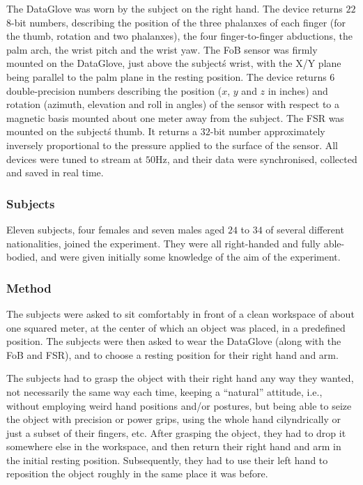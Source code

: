 The DataGlove was worn by the subject on the right hand. The device
returns $22$ $8$-bit numbers, describing the position of the three
phalanxes of each finger (for the thumb, rotation and two phalanxes),
the four finger-to-finger abductions, the palm arch, the wrist pitch
and the wrist yaw. The FoB sensor was firmly mounted on the DataGlove,
just above the subject\'s wrist, with the X/Y plane being parallel to
the palm plane in the resting position. The device returns $6$
double-precision numbers describing the position ($x$, $y$ and $z$ in
inches) and rotation (azimuth, elevation and roll in angles) of the
sensor with respect to a magnetic basis mounted about one meter away
from the subject. The FSR was mounted on the subject\'s thumb. It
returns a $32$-bit number approximately inversely proportional to the
pressure applied to the surface of the sensor. All devices were tuned
to stream at $50$Hz, and their data were synchronised, collected and
saved in real time.

\subsubsection*{Subjects}

Eleven subjects, four females and seven males aged $24$ to $34$ of
several different nationalities, joined the experiment. They were all
right-handed and fully able-bodied, and were given initially some
knowledge of the aim of the experiment.

\subsubsection*{Method}

The subjects were asked to sit comfortably in front of a clean
workspace of about one squared meter, at the center of which an object
was placed, in a predefined position. The subjects were then asked to
wear the DataGlove (along with the FoB and FSR), and to choose a
resting position for their right hand and arm.

The subjects had to grasp the object with their right hand any way
they wanted, not necessarily the same way each time, keeping a
``natural'' attitude, i.e., without employing weird hand positions
and/or postures, but being able to seize the object with precision or
power grips, using the whole hand cilyndrically or just a subset of
their fingers, etc. After grasping the object, they had to drop it
somewhere else in the workspace, and then return their right hand and
arm in the initial resting position. Subsequently, they had to use
their left hand to reposition the object roughly in the same place it
was before.

